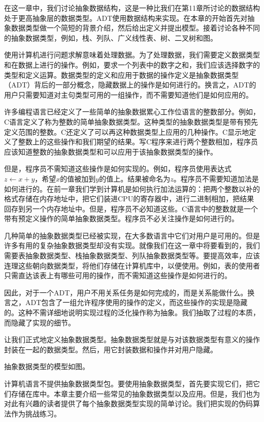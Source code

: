 在这一章中，我们讨论抽象数据结构，这是一种比我们在第11章所讨论的数据结构处于更高抽象层的数据类型。ADT使用数据结构来实现。在本章的开始首先对抽象数据类型做一个简短的背景介绍，然后给出定义并提出模型。接着讨论各种不同的抽象数据类型，例如，栈、列队、广义线性表、树、二叉树和图。

使用计算机进行问题求解意味着处理数据。为了处理数据，我们需要定义数据类型和在数据上进行的操作。例如，要求一个列表中的数字之和，我们应该选择数字的类型和定义运算。数据类型的定义和应用于数据的操作定义是抽象数据类型（ADT）背后的一部分概念，隐藏数据上的操作是如何进行的。换言之，ADT的用户只需要知道对主句类型可用的一组操作，而不需要知道他们是如何应用的。

许多编程语言已经定义了一些简单的抽象数据累心工作位语言的整数部分。例如，C语言定义了称为整数的简单抽象数据类型。这种类型的抽象数据类型是带有预先定义范围的整数。C还定义了可以再这种数据类型上应用的几种操作。C显示地定义了整数上的这些操作和我们期望的结果。写C程序来进行两个整数相加，程序员应该知道整数的抽象数据类型和可以应用于该抽象数据类型的操作。

但是，程序员不需知道这些操作是如何实现的。例如，程序员使用表达式$z\leftarrow x+y$，希望$x$的值被加到$y$的值上。结果被命名为$z$。程序员不需要知道加法是如何进行的。在前一章我们学到计算机是如何执行加法运算的：把两个整数以补的格式存储在内存地址中，把它们装进CPU的寄存器中，进行二进制相加，把结果回存到另一个内存地址中。但是，程序员不必知道这些。C语言中的整数就是一个带有预定义操作的简单抽象数据类型。程序员不必关注操作是如何进行的。

几种简单的抽象数据类型已经被实现，在大多数语言中它们对用户是可用的。但是许多有用的复杂抽象数据类型却没有实现。就像我们在这一章中将要看到的，我们需要表抽象数据类型、栈抽象数据类型、列队抽象数据类型等。要提高效率，应该连理这些朝向数据类型，将他们存储在计算机库中，以便使用。例如，表的使用者只需直达该表上有哪些可用的操作，而不需知道这些操作是如何进行的。

因此，对于一个ADT，用户不用关系任务是如何完成的，而是关系能做什么。换言之，ADT包含了一组允许程序使用的操作的定义，而这些操作的实现是隐藏的。这种不需详细地说明实现过程的泛化操作称为抽象。我们抽取了过程的本质，而隐藏了实现的细节。

让我们正式地定义抽象数据类型。抽象数据类型就是与对该数据类型有意义的操作封装在一起的数据类型。然后，用它封装数据和操作并对用户隐藏。

抽象数据类型的模型如图。

计算机语言不提供抽象数据类型包。要使用抽象数据类型，首先要实现它们，把它们存储在库中。本章主要介绍一些常见的抽象数据类型以及应用。但是，我们也为对此有兴趣的读者提供了每个抽象数据类型实现的简单讨论。我们把实现的伪码算法作为挑战练习。

